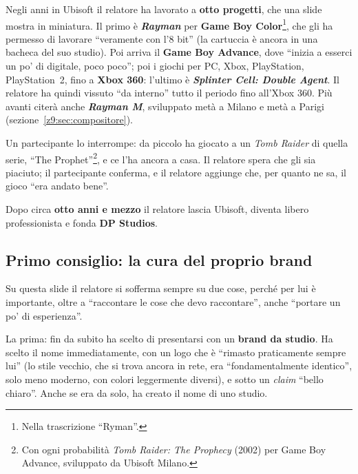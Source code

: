 Negli anni in Ubisoft il relatore ha lavorato a \textbf{otto progetti}, che una
slide mostra in miniatura. Il primo è \textbf{\emph{Rayman}} per \textbf{Game Boy
Color}\footnote{Nella trascrizione ``Ryman''.}, che gli ha permesso di lavorare
``veramente con l'8 bit'' (la cartuccia è ancora in una bacheca del suo studio).
Poi arriva il \textbf{Game Boy Advance}, dove ``inizia a esserci un po' di
digitale, poco poco''; poi i giochi per PC, Xbox, PlayStation, PlayStation~2,
fino a \textbf{Xbox 360}: l'ultimo è \textbf{\emph{Splinter Cell: Double
Agent}}. Il relatore ha quindi vissuto ``da interno'' tutto il periodo fino
all'Xbox 360. Più avanti citerà anche \textbf{\emph{Rayman M}}, sviluppato metà
a Milano e metà a Parigi (sezione~\ref{z9:sec:compositore}).

Un partecipante lo interrompe: da piccolo ha giocato a un \emph{Tomb Raider} di
quella serie, ``The Prophet''\footnote{Con ogni probabilità \emph{Tomb Raider:
The Prophecy} (2002) per Game Boy Advance, sviluppato da Ubisoft Milano.}, e ce
l'ha ancora a casa. Il relatore spera che gli sia piaciuto; il partecipante
conferma, e il relatore aggiunge che, per quanto ne sa, il gioco ``era andato
bene''.

Dopo circa \textbf{otto anni e mezzo} il relatore lascia Ubisoft, diventa libero
professionista e fonda \textbf{DP Studios}.

\subsection{Primo consiglio: la cura del proprio brand}

Su questa slide il relatore si sofferma sempre su due cose, perché per lui è
importante, oltre a ``raccontare le cose che devo raccontare'', anche
``portare un po' di esperienza''.

La prima: fin da subito ha scelto di presentarsi con un \textbf{brand da studio}.
Ha scelto il nome immediatamente, con un logo che è ``rimasto praticamente
sempre lui'' (lo stile vecchio, che si trova ancora in rete, era ``fondamentalmente
identico'', solo meno moderno, con colori leggermente diversi), e sotto un
\emph{claim} ``bello chiaro''. Anche se era da solo, ha creato il nome di uno
studio.

